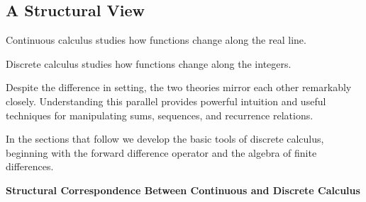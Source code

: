 \subsection*{A Structural View}

Continuous calculus studies how functions change along the real line.

Discrete calculus studies how functions change along the integers.

Despite the difference in setting, the two theories mirror each other
remarkably closely. Understanding this parallel provides powerful intuition and
useful techniques for manipulating sums, sequences, and recurrence relations.

In the sections that follow we develop the basic tools of discrete calculus,
beginning with the forward difference operator and the algebra of finite
differences.

\begin{center}
\textbf{Structural Correspondence Between Continuous and Discrete Calculus}
\end{center}

\begin{center}
\end{center}



